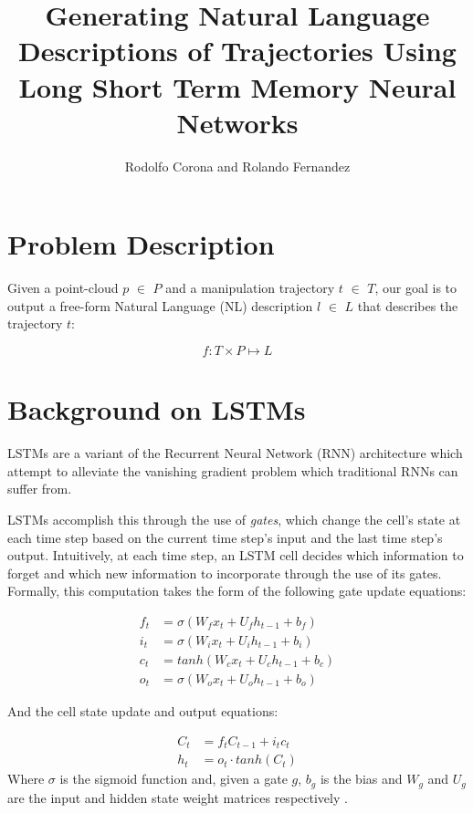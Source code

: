 \documentclass[letterpaper, 12 pt, conference]{ieeeconf}
\title{\LARGE \bf
Generating Natural Language Descriptions of Trajectories Using Long Short Term Memory Neural Networks}
\author{Rodolfo Corona and Rolando Fernandez}
\begin{document}
\maketitle
\thispagestyle{empty}
\pagestyle{empty}

\section{Problem Description}

Given a point-cloud $p$ $\in$ $P$ and a manipulation trajectory $t$ $\in$ $T$, our goal is to output a free-form  Natural Language (NL) description $l$ $\in$ $L$ that describes the trajectory $t$:

\begin{equation}
f: T\times P \mapsto L
\end{equation}

\section{Background on LSTMs}

LSTMs are a variant of the Recurrent Neural Network (RNN) architecture which attempt to alleviate the vanishing gradient problem which traditional RNNs can suffer from. 
\par
LSTMs accomplish this through the use of \textit{gates}, which change the cell's state at each time step based on the current time step's input and the last time step's output. Intuitively, at each time step, an LSTM cell decides which information to forget and which new information to incorporate through the use of its gates. Formally, this computation takes the form of the following gate update equations: 

\begin{align}
f_t &= \sigma (W_fx_t + U_fh_{t-1}+b_f) \\
i_t&=\sigma (W_ix_t + U_ih_{t-1}+b_i) \\
c_t &= tanh (W_cx_t  + U_c h_{t-1}+b_c) \\
o_t &= \sigma (W_o x_t + U_o h_{t-1} + b_o)
\end{align}

And the cell state update and output equations:

\begin{align}
C_t &= f_tC_{t-1}+ i_t c_t \\
h_t&= o_t \cdot tanh(C_t)
\end{align}
Where $\sigma$ is the sigmoid function and, given a gate $g$, $b_g$ is the bias and $W_g$ and $U_g$ are the input and hidden state weight matrices respectively \cite{hochreiter1997long}.  
\end{document}
